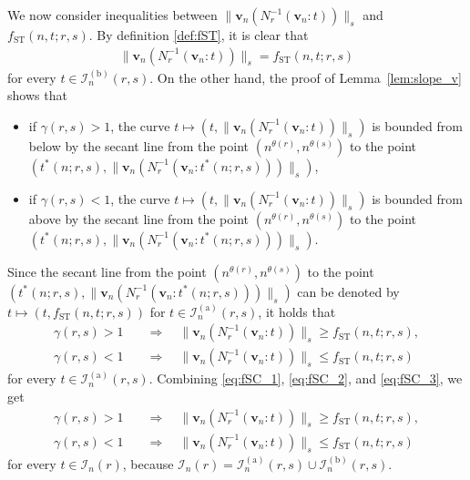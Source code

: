 \documentclass[conference, draftcls, onecolumn]{IEEEtran}
\theoremstyle{plain}
\newcommand{\bvec}[1]{\boldsymbol{#1}}
\newcommand{\lemref}[1]{Lemma~\ref{#1}}
\newcommand{\thref}[1]{Theorem~\ref{#1}}
\begin{document}
\begin{IEEEproof}[Proof of \thref{th:ST}]
We now consider inequalities between $\| \bvec{v}_{n}( N_{r}^{-1}( \bvec{v}_{n} : t ) ) \|_{s}$ and $f_{\mathrm{ST}}(n, t; r, s)$.
By definition \eqref{def:fST}, it is clear that
\begin{align}
\| \bvec{v}_{n}( N_{r}^{-1}( \bvec{v}_{n} : t ) ) \|_{s}
=
f_{\mathrm{ST}}(n, t; r, s)
\label{eq:fSC_1}
\end{align}
for every $t \in \mathcal{I}_{n}^{(\mathrm{b})}( r, s )$.
On the other hand, the proof of \lemref{lem:slope_v} shows that
\begin{itemize}
\item
if $\gamma( r, s ) > 1$, the curve $t \mapsto (t, \| \bvec{v}_{n}( N_{r}^{-1}( \bvec{v}_{n} : t ) ) \|_{s})$ is bounded from below by the secant line from the point $(n^{\theta( r )}, n^{\theta( s )})$ to the point $(t^{\ast}(n; r, s), \| \bvec{v}_{n}( N_{r}^{-1}( \bvec{v}_{n} : t^{\ast}(n; r, s) ) ) \|_{s})$,
\item
if $\gamma( r, s ) < 1$, the curve $t \mapsto (t, \| \bvec{v}_{n}( N_{r}^{-1}( \bvec{v}_{n} : t ) ) \|_{s})$ is bounded from above by the secant line from the point $(n^{\theta( r )}, n^{\theta( s )})$ to the point $(t^{\ast}(n; r, s), \| \bvec{v}_{n}( N_{r}^{-1}( \bvec{v}_{n} : t^{\ast}(n; r, s) ) ) \|_{s})$.
\end{itemize}
Since the secant line from the point $(n^{\theta( r )}, n^{\theta( s )})$ to the point $(t^{\ast}(n; r, s), \| \bvec{v}_{n}( N_{r}^{-1}( \bvec{v}_{n} : t^{\ast}(n; r, s) ) ) \|_{s})$ can be denoted by $t \mapsto (t, f_{\mathrm{ST}}(n, t; r, s))$ for $t \in \mathcal{I}_{n}^{(\mathrm{a})}( r, s )$, it holds that
\begin{align}
\gamma( r, s ) > 1
\quad & \Longrightarrow \quad
\| \bvec{v}_{n}( N_{r}^{-1}( \bvec{v}_{n} : t ) ) \|_{s}
\ge
f_{\mathrm{ST}}(n, t; r, s) ,
\label{eq:fSC_2} \\
\gamma( r, s ) < 1
\quad & \Longrightarrow \quad
\| \bvec{v}_{n}( N_{r}^{-1}( \bvec{v}_{n} : t ) ) \|_{s}
\le
f_{\mathrm{ST}}(n, t; r, s)
\label{eq:fSC_3}
\end{align}
for every $t \in \mathcal{I}_{n}^{(\mathrm{a})}(r, s)$.
Combining \eqref{eq:fSC_1}, \eqref{eq:fSC_2}, and \eqref{eq:fSC_3}, we get
\begin{align}
\gamma( r, s ) > 1
\quad & \Longrightarrow \quad
\| \bvec{v}_{n}( N_{r}^{-1}( \bvec{v}_{n} : t ) ) \|_{s}
\ge
f_{\mathrm{ST}}(n, t; r, s) ,
\label{eq:fSC_4} \\
\gamma( r, s ) < 1
\quad & \Longrightarrow \quad
\| \bvec{v}_{n}( N_{r}^{-1}( \bvec{v}_{n} : t ) ) \|_{s}
\le
f_{\mathrm{ST}}(n, t; r, s)
\label{eq:fSC_5}
\end{align}
for every $t \in \mathcal{I}_{n}( r )$, because $\mathcal{I}_{n}( r ) = \mathcal{I}_{n}^{(\mathrm{a})}( r, s ) \cup \mathcal{I}_{n}^{(\mathrm{b})}( r, s )$.


\end{IEEEproof}
\end{document}
